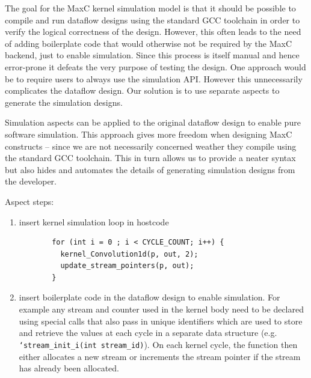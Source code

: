 The goal for the MaxC kernel simulation model is that it should be
possible to compile and run dataflow designs using the standard GCC
toolchain in order to verify the logical correctness of the
design. However, this often leads to the need of adding boilerplate
code that would otherwise not be required by the MaxC backend, just to
enable simulation. Since this process is itself manual and hence
error-prone it defeats the very purpose of testing the design. One
approach would be to require users to always use the simulation
API. However this unnecessarily complicates the dataflow design. Our
solution is to use separate aspects to generate the simulation
designs.

Simulation aspects can be applied to the original dataflow design to
enable pure software simulation. This approach gives more freedom when
designing MaxC constructs -- since we are not necessarily concerned
weather they compile using the standard GCC toolchain. This in turn
allows us to provide a neater syntax but also hides and automates the
details of generating simulation designs from the developer.

Aspect steps:

\begin{enumerate}

\item insert kernel simulation loop in hostcode %


\begin{figure}[!h]
\begin{lstlisting}
  for (int i = 0 ; i < CYCLE_COUNT; i++) {
    kernel_Convolution1d(p, out, 2);
    update_stream_pointers(p, out);
  }
\end{lstlisting}
\end{figure}

\item insert boilerplate code in the dataflow design to enable simulation.
  For example any stream and counter used in the kernel body need to
  be declared using special calls that also pass in unique identifiers
  which are used to store and retrieve the values at each cycle in a
  separate data structure (e.g. \texttt{`stream\_init\_i(int
    stream\_id)}). On each kernel cycle, the function then either
  allocates a new stream or increments the stream pointer if the
  stream has already been allocated.

\end{enumerate}

